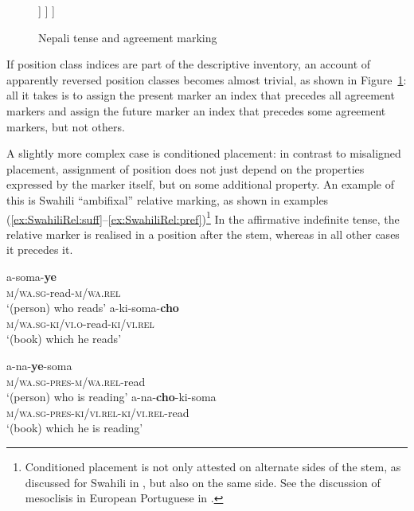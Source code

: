 \documentclass[output=paper
                ,modfonts
                ,nonflat
	        ,collection
	        ,collectionchapter
	        ,collectiontoclongg
 	        ,biblatex
                ,babelshorthands
                ,newtxmath
                ,draftmode
                ,colorlinks, citecolor=brown
] {langscibook}
\begin{document}
{\begin{figure}[htb]
{
		]
	]
]
\end{forest}
}
    \caption{Nepali tense and agreement marking}\label{fig:AnalysisNepali}
\end{figure}

If position class indices are part of the descriptive inventory, an
account of apparently reversed position classes \citep{Stump93}
becomes almost trivial, as shown in Figure~\ref{fig:AnalysisNepali}:
all it takes is to assign the present marker an index that precedes
all agreement markers and assign the future marker an index that
precedes some agreement markers, but not others.

A slightly more complex case is conditioned placement: in contrast to
misaligned placement, assignment of position does not just depend on
the properties expressed by the marker itself, but on some additional
property. An example of this is Swahili ``ambifixal'' relative
marking, as shown in examples
(\ref{ex:SwahiliRel:suff}--\ref{ex:SwahiliRel:pref})\footnote{Conditioned
  placement is not only attested on alternate sides of the stem, as
  discussed for Swahili in \citet{Stump93}, but also on the same
  side. See the discussion of mesoclisis in European Portuguese in
  \citet{Crysmann:Bonami:2016}.} In the affirmative indefinite tense,
the relative marker is realised in a position after the stem, whereas
in all other cases it precedes it. 

\begin{exe}
  \ex\label{ex:SwahiliRel:suff}
  \begin{xlist}
    \ex\gll  a-soma-\textbf{ye}\\
    \textsc{m/wa.sg}-read\textsc{-m/wa.rel}\\
    \glt ‘(person) who reads’
    \ex\gll a-ki-soma-\textbf{cho}\\
    \textsc{m/wa.sg}-\textsc{ki/vi.o}-read-\textsc{ki/vi.rel}\\
    \glt ‘(book) which he reads’
  \end{xlist}
  \ex\label{ex:SwahiliRel:pref}
  \begin{xlist}
    \ex\gll  a-na-\textbf{ye}-soma\\
    \textsc{m/wa.sg-pres-m/wa.rel}-read\\
    \glt ‘(person) who is reading’
    \ex\gll a-na-\textbf{cho}-ki-soma\\
    \textsc{m/wa.sg-pres-ki/vi.rel-ki/vi.rel}-read\\
    \glt ‘(book) which he is reading’
  \end{xlist}
\end{exe}

}
\end{document}
